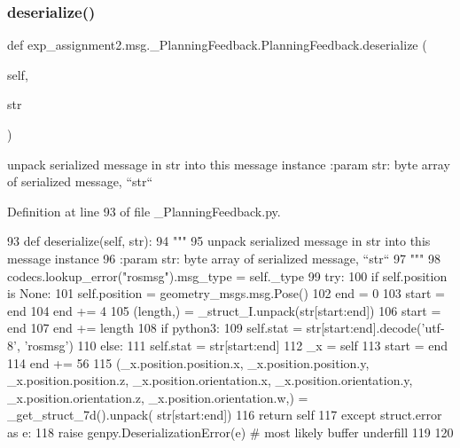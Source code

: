 \subsubsection{\texorpdfstring{deserialize()}{deserialize()}}
{\footnotesize\ttfamily def exp\+\_\+assignment2.\+msg.\+\_\+\+Planning\+Feedback.\+Planning\+Feedback.\+deserialize (\begin{DoxyParamCaption}\item[{}]{self,  }\item[{}]{str }\end{DoxyParamCaption})}

\begin{DoxyVerb}unpack serialized message in str into this message instance
:param str: byte array of serialized message, ``str``
\end{DoxyVerb}
 

Definition at line 93 of file \+\_\+\+Planning\+Feedback.\+py.


\begin{DoxyCode}
93   \textcolor{keyword}{def }deserialize(self, str):
94     \textcolor{stringliteral}{"""}
95 \textcolor{stringliteral}{    unpack serialized message in str into this message instance}
96 \textcolor{stringliteral}{    :param str: byte array of serialized message, ``str``}
97 \textcolor{stringliteral}{    """}
98     codecs.lookup\_error(\textcolor{stringliteral}{"rosmsg"}).msg\_type = self.\_type
99     \textcolor{keywordflow}{try}:
100       \textcolor{keywordflow}{if} self.position \textcolor{keywordflow}{is} \textcolor{keywordtype}{None}:
101         self.position = geometry\_msgs.msg.Pose()
102       end = 0
103       start = end
104       end += 4
105       (length,) = \_struct\_I.unpack(str[start:end])
106       start = end
107       end += length
108       \textcolor{keywordflow}{if} python3:
109         self.stat = str[start:end].decode(\textcolor{stringliteral}{'utf-8'}, \textcolor{stringliteral}{'rosmsg'})
110       \textcolor{keywordflow}{else}:
111         self.stat = str[start:end]
112       \_x = self
113       start = end
114       end += 56
115       (\_x.position.position.x, \_x.position.position.y, \_x.position.position.z, \_x.position.orientation.x, 
      \_x.position.orientation.y, \_x.position.orientation.z, \_x.position.orientation.w,) = \_get\_struct\_7d().unpack(
      str[start:end])
116       \textcolor{keywordflow}{return} self
117     \textcolor{keywordflow}{except} struct.error \textcolor{keyword}{as} e:
118       \textcolor{keywordflow}{raise} genpy.DeserializationError(e)  \textcolor{comment}{# most likely buffer underfill}
119 
120 
\end{DoxyCode}
\mbox{\label{classexp__assignment2_1_1msg_1_1__PlanningFeedback_1_1PlanningFeedback_a6c10d6b4c5a6f13bda1007a4af6a293a}} 
